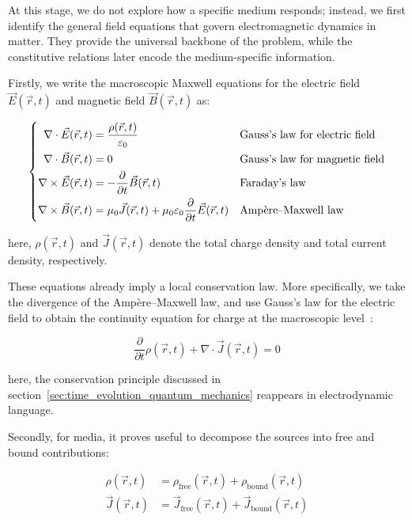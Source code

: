 At this stage, we do not explore how a specific medium responds;
instead, we first identify the general field equations that govern electromagnetic dynamics in matter.
They provide the universal backbone of the problem, while the constitutive relations later encode the medium-specific information.

Firstly, we write the macroscopic Maxwell equations for the electric field $\vec{E}(\vec{r},t)$ and magnetic field $\vec{B}(\vec{r},t)$ as:

\begin{equation}
\left\{\begin{aligned}
    \nabla\cdot\vec{E}(\vec{r},t) &= \frac{\rho(\vec{r},t)}{\varepsilon_0} 
    &&\space \text{Gauss's law for electric field} \\
    \nabla\cdot\vec{B}(\vec{r},t) &= 0 
    &&\space \text{Gauss's law for magnetic field} \\
    \nabla\times\vec{E}(\vec{r},t) &= -\frac{\partial}{\partial t}\vec{B}(\vec{r},t) 
    &&\space \text{Faraday's law} \\
    \nabla\times\vec{B}(\vec{r},t) &= \mu_0\vec{J}(\vec{r},t)+\mu_0\varepsilon_0\frac{\partial}{\partial t}\vec{E}(\vec{r},t)
    &&\space \text{Ampère--Maxwell law}
\end{aligned}\right.
\label{maxwell_equations_with_total_sources}
\end{equation}

here, $\rho(\vec{r},t)$ and $\vec{J}(\vec{r},t)$ denote the total charge density and total current density, respectively.

These equations already imply a local conservation law.
More specifically, we take the divergence of the Ampère--Maxwell law,
and use Gauss's law for the electric field to obtain the continuity equation for charge at the macroscopic level~\cite{landau2013electrodynamics}:

\begin{equation}
    \frac{\partial}{\partial t}\rho(\vec{r},t)+\nabla\cdot\vec{J}(\vec{r},t)=0
\label{macroscopic_charge_continuity_equation}
\end{equation}

here, the conservation principle discussed in section~\ref{sec:time_evolution_quantum_mechanics} reappears in electrodynamic language.

Secondly, for media, it proves useful to decompose the sources into free and bound contributions:

\begin{equation}
\begin{aligned}
    \rho(\vec{r},t) &= \rho_\mathrm{free}(\vec{r},t)+\rho_\mathrm{bound}(\vec{r},t) \\
    \vec{J}(\vec{r},t) &= \vec{J}_\mathrm{free}(\vec{r},t)+\vec{J}_\mathrm{bound}(\vec{r},t)
\end{aligned}
\label{free_and_bound_source_decomposition}
\end{equation}

